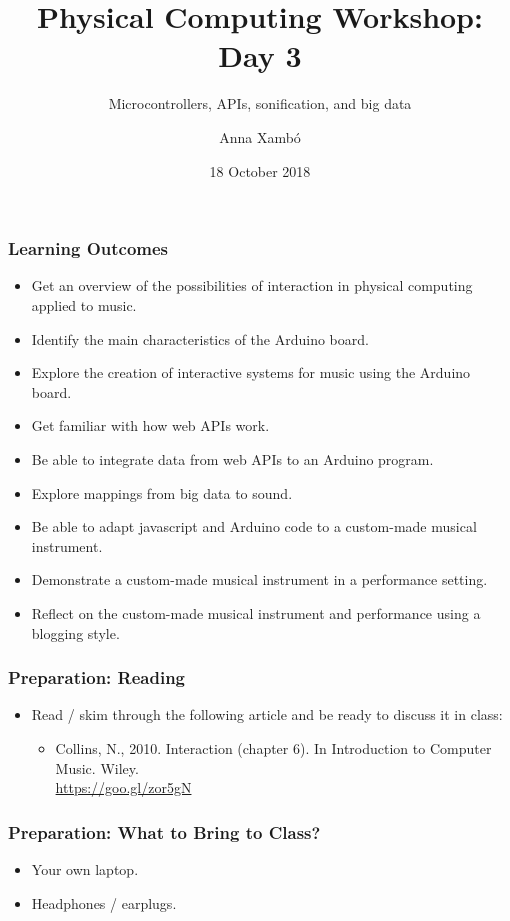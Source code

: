 \documentclass[screen, aspectratio=43]{beamer}
\title[PCW-d1]{Physical Computing Workshop: Day 3}
\subtitle{Microcontrollers, APIs, sonification, and big data}
\author[A. Xamb{\'o}]{Anna Xamb{\'o}}
\institute[NTNU]{Department of Music, NTNU}
\date{18 October 2018}
\begin{document}
\begin{frame}
  \titlepage
\end{frame}
%
\begin{frame}
  \frametitle{Learning Outcomes}
  \begin{itemize}
    \item Get an overview of the possibilities of interaction in physical computing applied to music.
    \item Identify the main characteristics of the Arduino board.
    \item Explore the creation of interactive systems for music using the Arduino board.    
    \item Get familiar with how web APIs work.
    \item Be able to integrate data from web APIs to an Arduino program.
    \item Explore mappings from big data to sound.
    \item Be able to adapt javascript and Arduino code to a custom-made musical instrument.     
    \item Demonstrate a custom-made musical instrument in a performance setting.
    \item Reflect on the custom-made musical instrument and performance using a blogging style.   
  \end{itemize}
\end{frame}
\begin{frame}
  \frametitle{Preparation: Reading}
        \begin{itemize}
        \item Read / skim through the following article and be ready to discuss it in class:
         \begin{itemize}
         \item Collins, N., 2010. Interaction (chapter 6). In Introduction to Computer Music. Wiley. \\
         \url{https://goo.gl/zor5gN}
         \end{itemize}    
         \end{itemize}
\end{frame}
%
\begin{frame}
  \frametitle{Preparation: What to Bring to Class?}
        \begin{itemize}
        \item Your own laptop.
        \item Headphones / earplugs.
         \end{itemize}
\end{frame}
\end{document}
